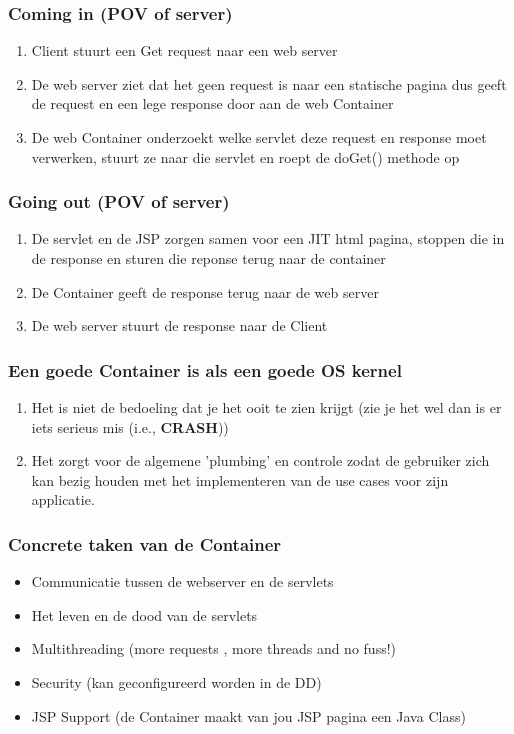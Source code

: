 \documentclass{beamer}
\begin{document}
\begin{frame}

\frametitle{Coming in (POV of server)}
{\Large 
\begin{enumerate}
  \item Client stuurt een Get request naar een web server
  \item De web server ziet dat het geen request is naar een statische pagina dus geeft de request en een lege response door aan de web Container
  \item De web Container onderzoekt welke servlet deze request en response moet verwerken, stuurt ze naar die servlet en roept de doGet() methode op
\end{enumerate}
}
\end{frame}


\begin{frame}

\frametitle{Going out (POV of server)}
{\Large 
\begin{enumerate}
  \item De servlet en de JSP zorgen samen voor een JIT html pagina, stoppen die in de response en sturen die reponse terug naar de container
  \item De Container geeft de response terug naar de web server
  \item De web server stuurt de response naar de Client
\end{enumerate}
}
\end{frame}


\begin{frame}

\frametitle{Een goede Container is als een goede OS kernel}

{\Large 

\begin{enumerate}
  \item Het is niet de bedoeling dat je het ooit te zien krijgt (zie je het wel dan is er iets serieus mis (i.e., \textbf{CRASH}))
  \item Het zorgt voor de algemene 'plumbing' en controle zodat de gebruiker zich kan bezig houden met het implementeren van de use cases voor zijn applicatie.
\end{enumerate}

}

\end{frame}


\begin{frame}

\frametitle{Concrete taken van de Container}
{\Large 
\begin{itemize}
  \item Communicatie tussen de webserver en de servlets
  \item Het leven en de dood van de servlets
  \item Multithreading (more requests , more threads and no fuss!)
  \item Security (kan geconfigureerd worden in de DD)
  \item JSP Support (de Container maakt van jou JSP pagina een Java Class)
\end{itemize}
}
\end{frame}
\end{document}
